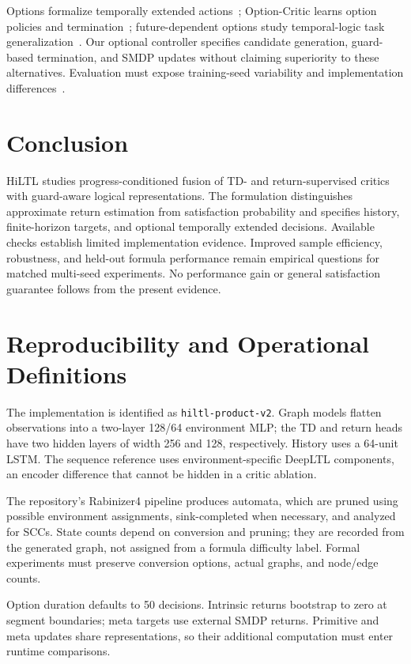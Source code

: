 \documentclass[conference]{IEEEtran}
\begin{document}
Options formalize temporally extended actions~\citep{SuttonPrecupSingh1999}; Option-Critic learns option policies and termination~\citep{Bacon2017}; future-dependent options study temporal-logic task generalization~\citep{XuFekri2024}. Our optional controller specifies candidate generation, guard-based termination, and SMDP updates without claiming superiority to these alternatives. Evaluation must expose training-seed variability and implementation differences~\citep{Henderson2018}.

\section{Conclusion}
HiLTL studies progress-conditioned fusion of TD- and return-supervised critics with guard-aware logical representations. The formulation distinguishes approximate return estimation from satisfaction probability and specifies history, finite-horizon targets, and optional temporally extended decisions. Available checks establish limited implementation evidence. Improved sample efficiency, robustness, and held-out formula performance remain empirical questions for matched multi-seed experiments. No performance gain or general satisfaction guarantee follows from the present evidence.

\appendices
\section{Reproducibility and Operational Definitions}
The implementation is identified as \texttt{hiltl-product-v2}. Graph models flatten observations into a two-layer 128/64 environment MLP; the TD and return heads have two hidden layers of width 256 and 128, respectively. History uses a 64-unit LSTM. The sequence reference uses environment-specific DeepLTL components, an encoder difference that cannot be hidden in a critic ablation.

The repository's Rabinizer4 pipeline produces automata, which are pruned using possible environment assignments, sink-completed when necessary, and analyzed for SCCs. State counts depend on conversion and pruning; they are recorded from the generated graph, not assigned from a formula difficulty label. Formal experiments must preserve conversion options, actual graphs, and node/edge counts.

Option duration defaults to 50 decisions. Intrinsic returns bootstrap to zero at segment boundaries; meta targets use external SMDP returns. Primitive and meta updates share representations, so their additional computation must enter runtime comparisons.
\end{document}
